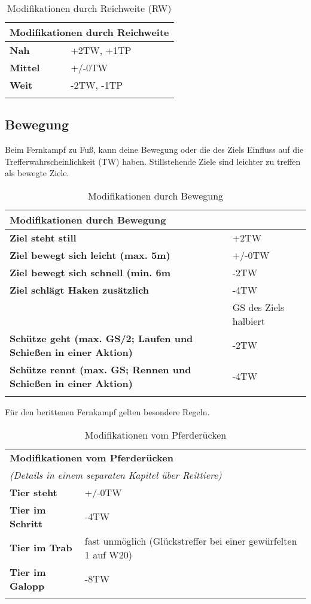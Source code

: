 \begin{longtable}{|p{3cm}|p{5cm}|}
\hline
\multicolumn{2}{|l|}{\textbf{Modifikationen durch Reichweite}} \\ \hline
\textbf{Nah} & +2TW, +1TP \\ \hline
\textbf{Mittel} & +/-0TW \\ \hline
\textbf{Weit} & -2TW, -1TP \\ \hline

\caption{Modifikationen durch Reichweite (RW)}
\label{tab:ReichweitenModifikationen}
\end{longtable}

\subsection{Bewegung} 
Beim Fernkampf zu Fuß, kann deine Bewegung oder die des Ziels Einfluss auf die Trefferwahrscheinlichkeit (TW) haben. Stillstehende Ziele sind leichter zu treffen als bewegte Ziele.

\begin{longtable}{|p{6cm}|p{5cm}|}
\hline
\multicolumn{2}{|l|}{\textbf{Modifikationen durch Bewegung}} \\ \hline
\textbf{Ziel steht still} & +2TW \\ \hline
\textbf{Ziel bewegt sich leicht (max. 5m)} & +/-0TW \\ \hline
\textbf{Ziel bewegt sich schnell (min. 6m} & -2TW \\ \hline
\textbf{Ziel schlägt Haken zusätzlich} & -4TW \\
& GS des Ziels halbiert \\ \hline
\textbf{Schütze geht (max. GS/2; Laufen und Schießen in einer Aktion)} & -2TW \\ \hline
\textbf{Schütze rennt (max. GS; Rennen und Schießen in einer Aktion)} & -4TW \\ \hline

\caption{Modifikationen durch Bewegung}
\label{tab:BewegungModifikationen}
\end{longtable}

Für den berittenen Fernkampf gelten besondere Regeln.

\begin{longtable}{|p{4cm}|p{7cm}|}
\hline
\multicolumn{2}{|l|}{\textbf{Modifikationen vom Pferderücken}} \\ 
\multicolumn{2}{|l|}{\textit{(Details in einem separaten Kapitel über Reittiere)}} \\ \hline
\textbf{Tier steht} & +/-0TW \\ \hline
\textbf{Tier im Schritt} & -4TW \\ \hline
\textbf{Tier im Trab} & fast unmöglich (Glückstreffer bei einer gewürfelten 1 auf W20) \\ \hline
\textbf{Tier im Galopp} & -8TW \\ \hline

\caption{Modifikationen vom Pferderücken}
\label{tab:PferderückenModifikationen}
\end{longtable}

